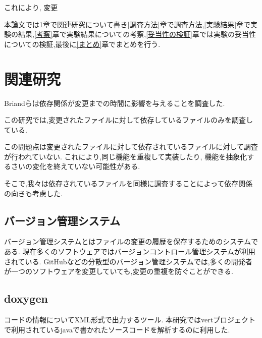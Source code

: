 \documentclass[submit,ses,noauthor]{ipsj} %
\begin{document}
これにより, 変更




本論文では\ref{関連研究}章で関連研究について書き\ref{調査方法}章で調査方法,\ref{実験結果}章で実験の結果,\ref{考察}章で実験結果についての考察,\ref{妥当性の検証}章では実験の妥当性についての検証,最後に\ref{まとめ}章でまとめを行う.


\section{関連研究}\label{関連研究}

Briandらは依存関係が変更までの時間に影響を与えることを調査した.

この研究では,変更されたファイルに対して依存しているファイルのみを調査している.

この問題点は変更されたファイルに対して依存されているファイルに対して調査が行われていない.
これにより,同じ機能を重複して実装したり, 機能を抽象化するさいの変化を終えていない可能性がある.

そこで,我々は依存されているファイルを同様に調査することによって依存関係の向きも考慮した.




\subsection{バージョン管理システム}
バージョン管理システムとはファイルの変更の履歴を保存するためのシステムである.
現在多くのソフトウェアではバージョンコントロール管理システムが利用されている.
GitHubなどの分散型のバージョン管理システムでは,多くの開発者が一つのソフトウェアを変更していても,変更の重複を防ぐことができる.


\subsection{doxygen}
コードの情報についてXML形式で出力するツール.
本研究ではvertプロジェクトで利用されているjavaで書かれたソースコードを解析するのに利用した.
\end{document}

